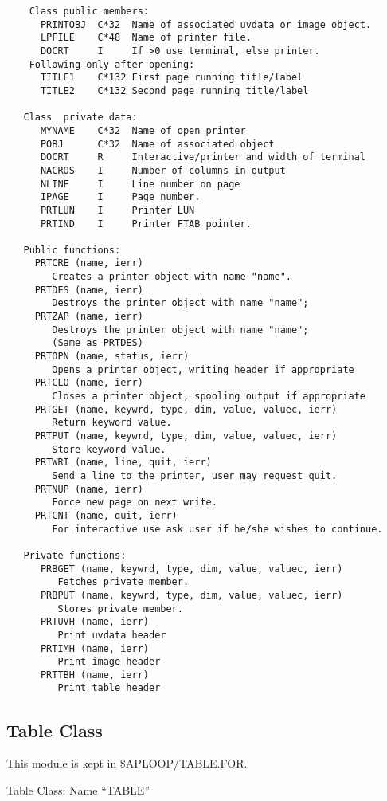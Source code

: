 {\small\begin{verbatim}
    Class public members:
      PRINTOBJ  C*32  Name of associated uvdata or image object.
      LPFILE    C*48  Name of printer file.
      DOCRT     I     If >0 use terminal, else printer.
    Following only after opening:
      TITLE1    C*132 First page running title/label
      TITLE2    C*132 Second page running title/label

   Class  private data:
      MYNAME    C*32  Name of open printer
      POBJ      C*32  Name of associated object
      DOCRT     R     Interactive/printer and width of terminal
      NACROS    I     Number of columns in output
      NLINE     I     Line number on page
      IPAGE     I     Page number.
      PRTLUN    I     Printer LUN
      PRTIND    I     Printer FTAB pointer.

   Public functions:
     PRTCRE (name, ierr)
        Creates a printer object with name "name".
     PRTDES (name, ierr)
        Destroys the printer object with name "name";
     PRTZAP (name, ierr)
        Destroys the printer object with name "name";
        (Same as PRTDES)
     PRTOPN (name, status, ierr)
        Opens a printer object, writing header if appropriate
     PRTCLO (name, ierr)
        Closes a printer object, spooling output if appropriate
     PRTGET (name, keywrd, type, dim, value, valuec, ierr)
        Return keyword value.
     PRTPUT (name, keywrd, type, dim, value, valuec, ierr)
        Store keyword value.
     PRTWRI (name, line, quit, ierr)
        Send a line to the printer, user may request quit.
     PRTNUP (name, ierr)
        Force new page on next write.
     PRTCNT (name, quit, ierr)
        For interactive use ask user if he/she wishes to continue.

   Private functions:
      PRBGET (name, keywrd, type, dim, value, valuec, ierr)
         Fetches private member.
      PRBPUT (name, keywrd, type, dim, value, valuec, ierr)
         Stores private member.
      PRTUVH (name, ierr)
         Print uvdata header
      PRTIMH (name, ierr)
         Print image header
      PRTTBH (name, ierr)
         Print table header
\end{verbatim}}

\subsection{Table Class}

   This module is kept in \$APLOOP/TABLE.FOR.

   Table Class: Name ``TABLE''

